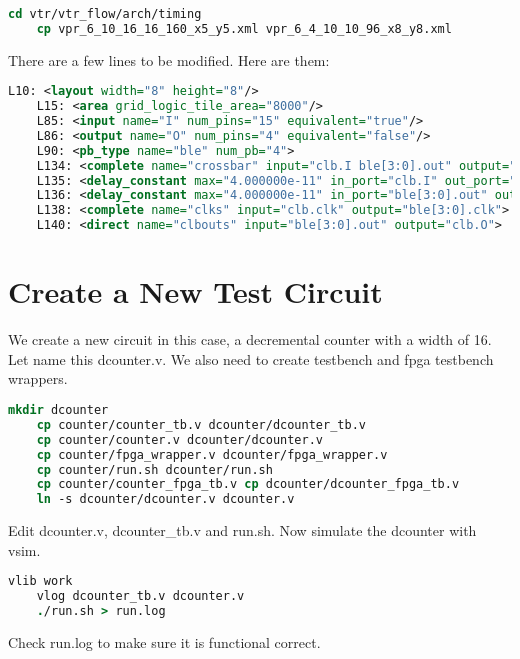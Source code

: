 \documentclass[10pt]{article}
\begin{document}
\begin{lstlisting}[language=csh]
    cd vtr/vtr_flow/arch/timing
    cp vpr_6_10_16_16_160_x5_y5.xml vpr_6_4_10_10_96_x8_y8.xml
\end{lstlisting}

\noindent
There are a few lines to be modified. Here are them:

\begin{lstlisting}[language=xml]
    L10: <layout width="8" height="8"/>
    L15: <area grid_logic_tile_area="8000"/>
    L85: <input name="I" num_pins="15" equivalent="true"/>
    L86: <output name="O" num_pins="4" equivalent="false"/>
    L90: <pb_type name="ble" num_pb="4">
    L134: <complete name="crossbar" input="clb.I ble[3:0].out" output="ble[3:0].in">
    L135: <delay_constant max="4.000000e-11" in_port="clb.I" out_port="ble[3:0].in" />
    L136: <delay_constant max="4.000000e-11" in_port="ble[3:0].out" out_port="ble[3:0].in" />
    L138: <complete name="clks" input="clb.clk" output="ble[3:0].clk">
    L140: <direct name="clbouts" input="ble[3:0].out" output="clb.O">
\end{lstlisting}

\section{Create a New Test Circuit}

We create a new circuit in this case, a decremental counter with a width of 16. Let name this dcounter.v.
We also need to create testbench and fpga testbench wrappers.

\begin{lstlisting}[language=csh]
    mkdir dcounter
    cp counter/counter_tb.v dcounter/dcounter_tb.v
    cp counter/counter.v dcounter/dcounter.v
    cp counter/fpga_wrapper.v dcounter/fpga_wrapper.v
    cp counter/run.sh dcounter/run.sh
    cp counter/counter_fpga_tb.v cp dcounter/dcounter_fpga_tb.v
    ln -s dcounter/dcounter.v dcounter.v
\end{lstlisting}

\noindent
Edit dcounter.v, dcounter\_tb.v and run.sh. Now simulate the dcounter with vsim.

\begin{lstlisting}[language=csh]
    vlib work
    vlog dcounter_tb.v dcounter.v
    ./run.sh > run.log
\end{lstlisting}

\noindent
Check run.log to make sure it is functional correct.
\end{document}
